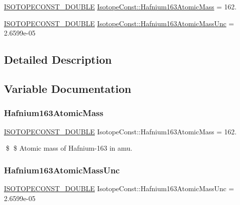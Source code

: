 \begin{DoxyCompactItemize}
\item 
\mbox{\hyperlink{group___isotope_const-_macros_ga8f45a7272ce02c0b4c65c44636ed719a}{I\+S\+O\+T\+O\+P\+E\+C\+O\+N\+S\+T\+\_\+\+D\+O\+U\+B\+LE}} \mbox{\hyperlink{group___isotope_const-_hafnium-_hf163_gaa0371a0b16d9c13b5383b18d45fac967}{Isotope\+Const\+::\+Hafnium163\+Atomic\+Mass}} = 162.
\item 
\mbox{\hyperlink{group___isotope_const-_macros_ga8f45a7272ce02c0b4c65c44636ed719a}{I\+S\+O\+T\+O\+P\+E\+C\+O\+N\+S\+T\+\_\+\+D\+O\+U\+B\+LE}} \mbox{\hyperlink{group___isotope_const-_hafnium-_hf163_ga2524a57e1d9237edc8e6f1731b76d1f9}{Isotope\+Const\+::\+Hafnium163\+Atomic\+Mass\+Unc}} = 2.\+6599e-\/05
\end{DoxyCompactItemize}


\subsection{Detailed Description}


\subsection{Variable Documentation}
\mbox{\label{group___isotope_const-_hafnium-_hf163_gaa0371a0b16d9c13b5383b18d45fac967}} 
\subsubsection{\texorpdfstring{Hafnium163\+Atomic\+Mass}{Hafnium163AtomicMass}}
{\footnotesize\ttfamily \mbox{\hyperlink{group___isotope_const-_macros_ga8f45a7272ce02c0b4c65c44636ed719a}{I\+S\+O\+T\+O\+P\+E\+C\+O\+N\+S\+T\+\_\+\+D\+O\+U\+B\+LE}} Isotope\+Const\+::\+Hafnium163\+Atomic\+Mass = 162.}

\$ \$ Atomic mass of Hafnium-\/163 in amu. \mbox{\label{group___isotope_const-_hafnium-_hf163_ga2524a57e1d9237edc8e6f1731b76d1f9}} 
\subsubsection{\texorpdfstring{Hafnium163\+Atomic\+Mass\+Unc}{Hafnium163AtomicMassUnc}}
{\footnotesize\ttfamily \mbox{\hyperlink{group___isotope_const-_macros_ga8f45a7272ce02c0b4c65c44636ed719a}{I\+S\+O\+T\+O\+P\+E\+C\+O\+N\+S\+T\+\_\+\+D\+O\+U\+B\+LE}} Isotope\+Const\+::\+Hafnium163\+Atomic\+Mass\+Unc = 2.\+6599e-\/05}

